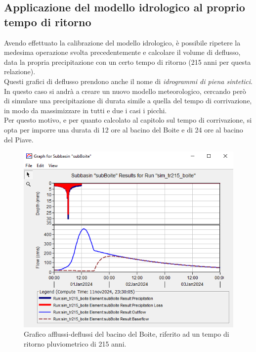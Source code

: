 \subsection{Applicazione del modello idrologico al proprio tempo di ritorno}
Avendo effettuato la calibrazione del modello idrologico, è possibile ripetere la medesima operazione svolta precedentemente e calcolare il volume di deflusso, data la propria precipitazione con un certo tempo di ritorno (215 anni per questa relazione).\\
Questi grafici di deflusso prendono anche il nome di \textit{idrogrammi di piena sintetici}.\\
In questo caso si andrà a creare un nuovo modello meteorologico, cercando però di simulare una precipitazione di durata simile a quella del tempo di corrivazione, in modo da massimizzare in tutti e due i casi i picchi.\\
Per questo motivo, e per quanto calcolato al capitolo sul tempo di corrivazione, si opta per imporre una durata di 12 ore al bacino del Boite e di 24 ore al bacino del Piave.

\begin{figure}[H]\centering
    \includegraphics[scale=0.9]{immagini/boite_215.PNG}
    \caption{Grafico afflussi-deflussi del bacino del Boite, riferito ad un tempo di ritorno pluviometrico di 215 anni.}
        \label{boite_215}    
\end{figure}

